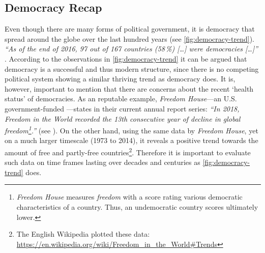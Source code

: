 \subsection{Democracy Recap}
\label{ssec:Democracy-Recap}

Even though there are many forms of political government, it is democracy that spread around the globe over the last hundred years (see \autoref{fig:democracy-trend}). \textit{“As of the end of 2016, 97 out of 167 countries (58\,\%) [\ldots] were democracies [\ldots]”} \parencite{Desilver2017}. According to the observations in \autoref{fig:democracy-trend} it can be argued that democracy is a successful and thus modern structure, since there is no competing political system showing a similar thriving trend as democracy does. It is, however, important to mention that there are concerns about the recent ‘health status’ of democracies. As an reputable example, \textit{Freedom House}---an U.S. government-funded ---states in their current annual report series: \textit{“In 2018, Freedom in the World recorded the 13th consecutive year of decline in global freedom\footnote{\textit{Freedom House} measures \textit{freedom} with a score rating various democratic characteristics of a country. Thus, an undemocratic country scores ultimately lower.}.”} (see \cite{FreedomHouse2019}). On the other hand, using the same data by \textit{Freedom House}, yet on a much larger timescale (1973 to 2014), it reveals a positive trend towards the amount of free and partly-free countries\footnote{The English Wikipedia plotted these data: \url{https://en.wikipedia.org/wiki/Freedom_in_the_World\#Trends}}. Therefore it is important to evaluate such data on time frames lasting over decades and centuries as \autoref{fig:democracy-trend} does. 


